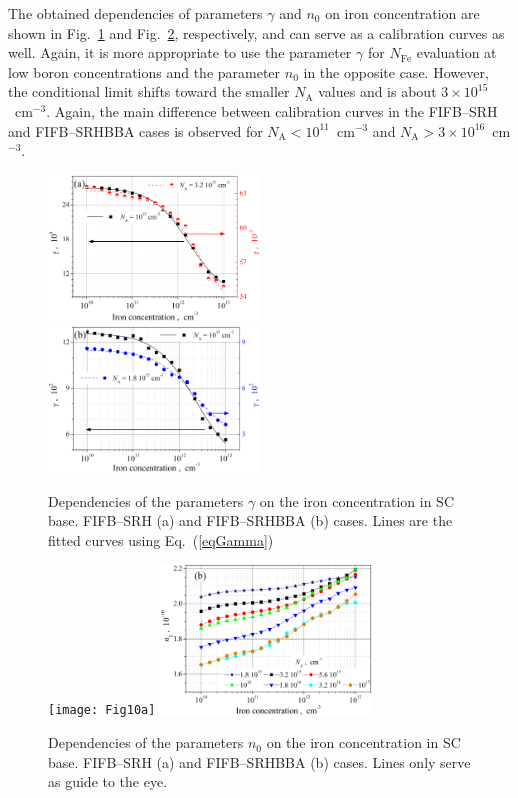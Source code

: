 \documentclass [sort&compress] {elsarticle}
\begin{document}
The obtained dependencies of parameters $\gamma$ and $n_0$ on iron concentration are shown in Fig.~\ref{fig9} and Fig.~\ref{fig10}, respectively,
and can serve as a calibration curves as well.
Again, it is more appropriate to use the parameter $\gamma$ for $N_\mathrm{Fe}$ evaluation at low boron concentrations and the parameter $n_0$ in the opposite case.
However, the conditional limit shifts toward the smaller $N_\mathrm{A}$ values and is about $3\times10^{15}$~cm$^{-3}$.
Again, the main difference between calibration curves in the FIFB--SRH and FIFB--SRHBBA cases is observed for $N_\mathrm{A}<10^{11}$~cm$^{-3}$ and $N_\mathrm{A}>3\times10^{16}$~cm$^{-3}$.


\begin{figure}
\includegraphics[width=0.5\textwidth]{Fig9a}%
\includegraphics[width=0.5\textwidth]{Fig9b}
\caption{\label{fig9}
Dependencies of the parameters $\gamma$ on the iron concentration in SC base.
FIFB--SRH (a) and FIFB--SRHBBA (b) cases.
Lines are the fitted curves using Eq.~(\ref{eqGamma})
}%
\end{figure}

\begin{figure}
\texttt{[image: Fig10a]}%
\includegraphics[width=0.5\textwidth]{Fig10b}
\caption{\label{fig10}
Dependencies of the parameters $n_0$ on the iron concentration in SC base.
FIFB--SRH (a) and FIFB--SRHBBA (b) cases.
Lines only serve as guide to the eye.
}%
\end{figure}
\end{document}

